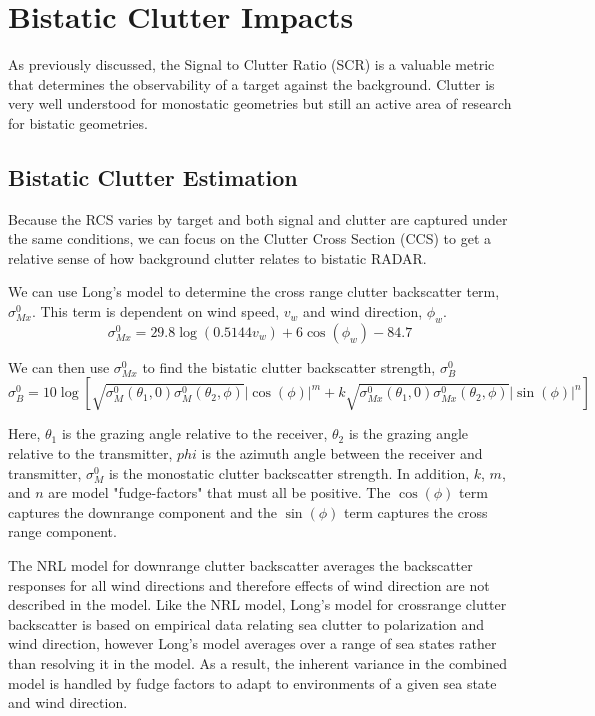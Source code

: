 \section{Bistatic Clutter Impacts}

As previously discussed, the Signal to Clutter Ratio (SCR) is a valuable metric that determines the observability of a target against the background. Clutter is very well understood for monostatic geometries but still an active area of research for bistatic geometries.

\subsection {Bistatic Clutter Estimation}
Because the RCS varies by target and both signal and clutter are captured under the same conditions, we can focus on the Clutter Cross Section (CCS) to get a relative sense of how background clutter relates to bistatic RADAR.

We can use Long's model \cite{griffiths_bistatic_clutter} to determine the cross range clutter backscatter term, $\sigma_{Mx}^0$. This term is dependent on wind speed, $v_w$ and wind direction, $\phi_w$.
\begin{equation}
\sigma_{Mx}^0 = 29.8\log\left(0.5144 v_w\right) + 6\cos\left(\phi_w \right) -84.7
\label{bc_eq:1}
\end{equation}
\renewcommand{\baselinestretch}{2} \small\normalsize

We can then use $\sigma_{Mx}^0$ to find the bistatic clutter backscatter strength, $\sigma_{B}^0$
\begin{equation}
\sigma_B^0 = 10\log\left[\sqrt{\sigma_M^0(\theta_1,0)\sigma_M^0(\theta_2,\phi)} |\cos(\phi)|^m  + k\sqrt{\sigma_{Mx}^0(\theta_1,0)\sigma_{Mx}^0(\theta_2,\phi)}|\sin(\phi)|^n \right]
\label{bc_eq:2}
\end{equation}
\renewcommand{\baselinestretch}{2} \small\normalsize

Here, $\theta_1$ is the grazing angle relative to the receiver, $\theta_2$ is the grazing angle relative to the transmitter, $phi$ is the azimuth angle between the receiver and transmitter, $\sigma_M^0$ is the monostatic clutter backscatter strength. In addition, $k$, $m$, and $n$ are model "fudge-factors" that must all be positive. The $\cos(\phi)$ term captures the downrange component and the $\sin(\phi)$ term captures the cross range component.

The NRL model for downrange clutter backscatter averages the backscatter responses for all wind directions and therefore effects of wind direction are not described in the model. Like the NRL model, Long's model for crossrange clutter backscatter is based on empirical data relating sea clutter to polarization and wind direction, however Long's model averages over a range of sea states rather than resolving it in the model. As a result, the inherent variance in the combined model is handled by fudge factors to adapt to environments of a given sea state and wind direction.


